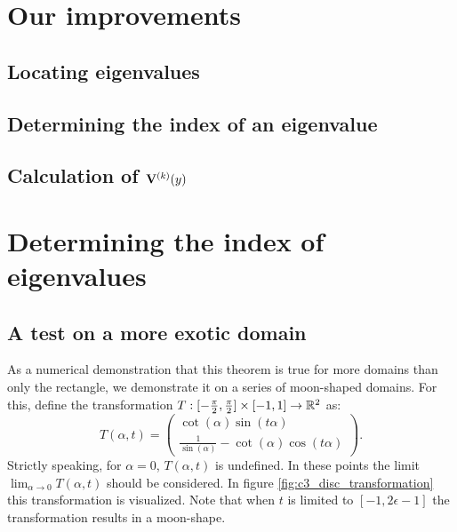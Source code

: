 \section{Our improvements}

\subsection{Locating eigenvalues}\label{sec:c3_locating_e}

\subsection{Determining the index of an eigenvalue}\label{sec:c3_index_of_e}

\subsection{Calculation of \texorpdfstring{$\vb{V}^{(k)}(y)$}{Vk(y)}}\label{sec:c3_calculate_vk}


\section{Determining the index of eigenvalues}

\begin{theorem}
    \label{the:c3_counting_eigenvalues}
\end{theorem}

\subsection{A test on a more exotic domain}

As a numerical demonstration that this theorem is true for more domains than only the rectangle, we demonstrate it on a series of moon-shaped domains. For this, define the transformation $T:[-\frac{\pi}{2}, \frac{\pi}{2}] \times [-1, 1] \to \mathbb{R}^2$ as:
\begin{equation}\label{equ:c3_disc_transformation}
    T(\alpha, t) = \begin{pmatrix}
        \cot(\alpha) \sin(t \alpha) \\
        \frac{1}{\sin(\alpha)} - \cot(\alpha) \cos(t \alpha)
    \end{pmatrix}\text{.}
\end{equation}
Strictly speaking, for $\alpha = 0$,  $T(\alpha, t)$ is undefined. In these points the limit $\lim_{\alpha \to 0} T(\alpha, t)$ should be considered. In figure \ref{fig:c3_disc_transformation} this transformation is visualized. Note that when $t$ is limited to $[-1, 2\epsilon -1]$ the transformation results in a moon-shape.

